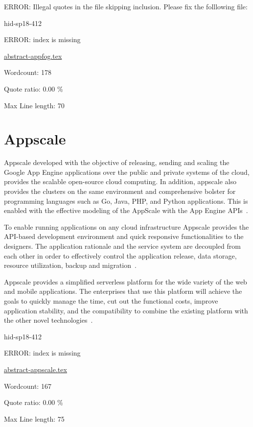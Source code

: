 ERROR: Illegal quotes in the file skipping inclusion. Please fix the folllowing file:

\begin{IU}

hid-sp18-412

ERROR: index is missing

\href{https://github.com/cloudmesh-community/hid-sp18-412/blob/master//technology/abstract-appfog.tex}{abstract-appfog.tex}

 

Wordcount: 178


Quote ratio: 0.00 \%
 
Max Line length: 70
\end{IU}

\section{Appscale}
Appscale developed with the objective of releasing, sending and scaling 
the Google App Engine applications over the public and private systems 
of the cloud, provides the scalable open-source cloud computing. 
In addition, appscale also provides the clusters on the same environment 
and comprehensive bolster for programming languages such as Go, Java, PHP, 
and Python applications. This is enabled with the effective modeling
of the AppScale with the App Engine APIs~\cite{hid-sp18-412-wiki_appscale}.

To enable running applications on any cloud infrastructure Appscale 
provides the API-based development environment and quick responsive 
functionalities to the designers. The application rationale and the 
service system are decoupled from each other in order to effectively 
control the application release, data storage, resource utilization, 
backup and migration~\cite{hid-sp18-412-wiki_appscale}.

Appscale provides a simplified serverless platform for the wide 
variety of the web and mobile applications. The enterprises that use 
this platform will achieve the goals to quickly manage the time, 
cut out the functional costs, improve application stability, and 
the compatibility to combine the existing platform with the other 
novel technologies~\cite{hid-sp18-412-git_appscale}.





\begin{IU}

hid-sp18-412

ERROR: index is missing

\href{https://github.com/cloudmesh-community/hid-sp18-412/blob/master//technology/abstract-appscale.tex}{abstract-appscale.tex}

 

Wordcount: 167


Quote ratio: 0.00 \%
 
Max Line length: 75
\end{IU}

